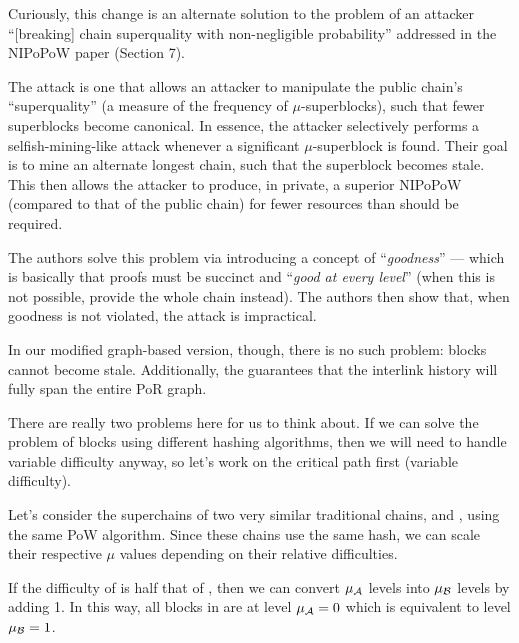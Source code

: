 Curiously, this change is an alternate solution to the problem of an attacker ``[breaking] chain superquality with non-negligible probability'' addressed in the NIPoPoW paper (Section 7). %

The attack is one that allows an attacker to manipulate the public chain's ``superquality'' (a measure of the frequency of $\mu$-superblocks), such that fewer superblocks become canonical.
In essence, the attacker selectively performs a selfish-mining-like attack whenever a significant $\mu$-superblock is found.
Their goal is to mine an alternate longest chain, such that the superblock becomes stale.
This then allows the attacker to produce, in private, a superior NIPoPoW (compared to that of the public chain) for fewer resources than should be required.

The authors solve this problem via introducing a concept of ``\emph{goodness}'' --- which is basically that proofs must be succinct and ``\emph{good at every level}'' (when this is not possible, provide the whole chain instead).
The authors then show that, when goodness is not violated, the attack is impractical.

In our modified graph-based version, though, there is no such problem: blocks cannot become stale.
Additionally, the \AxiomOfMaximalReflection guarantees that the interlink history will fully span the entire PoR graph.


There are really two problems here for us to think about.
If we can solve the problem of blocks using different hashing algorithms, then we will need to handle variable difficulty anyway, so let's work on the critical path first (variable difficulty).

\NewDocumentCommand{\tradA}{g}{\IfNoValueTF{#1}{\ensuremath{\mathcal{A}}}{\ensuremath{\mathcal{A}_{#1}}}\xspace}
\NewDocumentCommand{\tradB}{g}{\IfNoValueTF{#1}{\ensuremath{\mathcal{B}}}{\ensuremath{\mathcal{B}_{#1}}}\xspace}

Let's consider the superchains of two very similar traditional chains, \tradA and \tradB, using the same PoW algorithm.
Since these chains use the same hash, we can scale their respective $\mu$ values depending on their relative difficulties.

If the difficulty of \tradB is half that of \tradA, then we can convert $\mu_{\tradA}$ levels into $\mu_{\tradB}$ levels by adding 1.
In this way, all blocks in \tradA are at level $\mu_{\tradA}=0$ which is equivalent to level $\mu_{\tradB}=1$.

